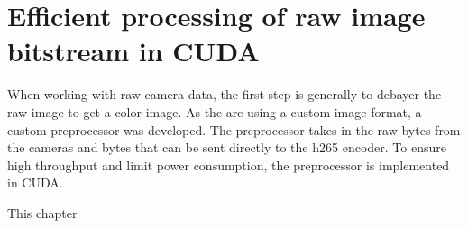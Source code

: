 \chapter{Efficient processing of raw image bitstream in CUDA}
\label{chap:debayer}
When working with raw camera data, the first step is generally to debayer the raw image to get a color image.
As the \cams are using a custom image format, a custom preprocessor was developed.
The preprocessor takes in the raw bytes from the cameras and bytes that can be sent directly to the \gls{h265} encoder.
To ensure high throughput and limit power consumption, the preprocessor is implemented in CUDA.

This chapter
